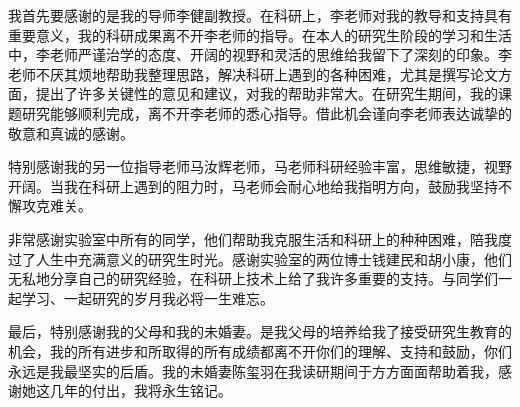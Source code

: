 \begin{thanks}
我首先要感谢的是我的导师李健副教授。在科研上，李老师对我的教导和支持具有重要意义，我的科研成果离不开李老师的指导。在本人的研究生阶段的学习和生活中，李老师严谨治学的态度、开阔的视野和灵活的思维给我留下了深刻的印象。李老师不厌其烦地帮助我整理思路，解决科研上遇到的各种困难，尤其是撰写论文方面，提出了许多关键性的意见和建议，对我的帮助非常大。在研究生期间，我的课题研究能够顺利完成，离不开李老师的悉心指导。借此机会谨向李老师表达诚挚的敬意和真诚的感谢。

特别感谢我的另一位指导老师马汝辉老师，马老师科研经验丰富，思维敏捷，视野开阔。当我在科研上遇到的阻力时，马老师会耐心地给我指明方向，鼓励我坚持不懈攻克难关。	

非常感谢实验室中所有的同学，他们帮助我克服生活和科研上的种种困难，陪我度过了人生中充满意义的研究生时光。感谢实验室的两位博士钱建民和胡小康，他们无私地分享自己的研究经验，在科研上技术上给了我许多重要的支持。与同学们一起学习、一起研究的岁月我必将一生难忘。

最后，特别感谢我的父母和我的未婚妻。是我父母的培养给我了接受研究生教育的机会，我的所有进步和所取得的所有成绩都离不开你们的理解、支持和鼓励，你们永远是我最坚实的后盾。我的未婚妻陈玺羽在我读研期间于方方面面帮助着我，感谢她这几年的付出，我将永生铭记。


\end{thanks}

